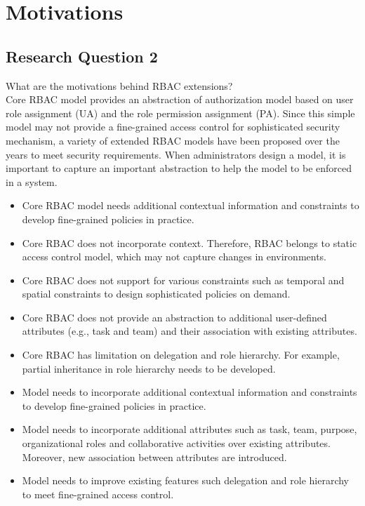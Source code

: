 \section{Motivations} \label{sec:motivations}

\subsection{Research Question 2}

What are the motivations behind RBAC extensions? \\

Core RBAC model provides an abstraction of authorization model based on user role assignment (UA) and the role
permission assignment (PA). Since this simple model may not provide a fine-grained access control for sophisticated
security mechanism, a variety of extended RBAC models have been proposed over the years to meet
security requirements. When administrators design a model, it is important to capture an important abstraction to help the model to be enforced in a system.

\begin{itemize}
\setlength{\itemsep}{0.25pt}
\item Core RBAC model needs additional contextual information and constraints to develop fine-grained policies in practice.
\item Core RBAC does not incorporate context. Therefore, RBAC belongs to static access control model, which may not capture changes in environments.
\item Core RBAC does not support for various constraints such as temporal and spatial constraints to design sophisticated policies on demand.
\item Core RBAC does not provide an abstraction to additional user-defined attributes	(e.g., task and team) and their association with existing attributes.
\item Core RBAC has limitation on delegation and role hierarchy. For example, partial inheritance in role hierarchy needs to be developed.  
\item Model needs to incorporate additional contextual information and constraints to develop fine-grained policies in practice.
\item Model needs to incorporate additional attributes such as
task, team, purpose, organizational roles and collaborative activities over existing attributes. Moreover, new association between attributes
are introduced. 
\item Model needs to improve existing features such delegation and role hierarchy to meet fine-grained access control. 
\end{itemize}


